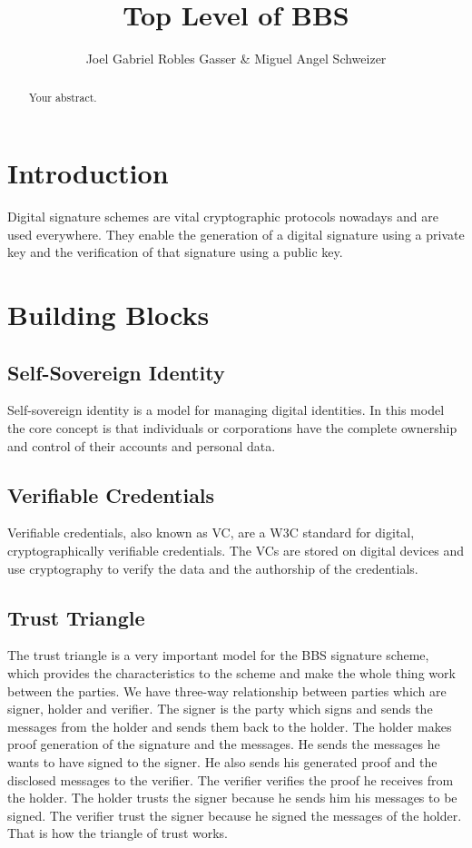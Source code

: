 \documentclass{article}
\title{Top Level of BBS}
\author{Joel Gabriel Robles Gasser \& Miguel Angel Schweizer}
\begin{document}
\maketitle

\begin{abstract}
Your abstract.
\end{abstract}

\tableofcontents


\section{Introduction}
Digital signature schemes are vital cryptographic protocols nowadays and are used everywhere. They enable the generation of a digital signature using a private key and the verification of that signature using a public key. 

\section{Building Blocks}

\subsection{Self-Sovereign Identity}

Self-sovereign identity is a model for managing digital identities. In this model the core concept is that individuals or corporations have the complete ownership and control of their accounts and personal data.

\subsection{Verifiable Credentials}

Verifiable credentials, also known as VC, are a W3C standard for digital, cryptographically verifiable credentials. The VCs are stored on digital devices and use cryptography to verify the data and the authorship of the credentials.

\subsection{Trust Triangle}

The trust triangle is a very important model for the BBS signature scheme, which provides the characteristics to the scheme and make the whole thing work between the parties. 
We have three-way relationship between parties which are signer, holder and verifier. 
The signer is the party which signs and sends the messages from the holder and sends them back to the holder.
The holder makes proof generation of the signature and the messages. He sends the messages he wants to have signed to the signer. He also sends his generated proof and the disclosed messages to the verifier.
The verifier verifies the proof he receives from the holder.
The holder trusts the signer because he sends him his messages to be signed. The verifier trust the signer because he signed the messages of the holder. 
That is how the triangle of trust works. 
\end{document}
